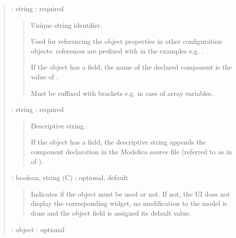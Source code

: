 \documentclass[letterpaper,10pt, openany,english]{sphinxmanual}
\begin{document}
\label{\detokenize{requirements:elementary-object}}
\begin{quote}

 : string : required
\begin{quote}

\begin{DUlineblock}{0em}
\item[] Unique string identifier.
\item[] Used for referencing the object properties in other configuration objects: references are prefixed with \sphinxcode{\sphinxupquote{\#}} in the examples e.g. .
\item[] If the object has a  field, the name of the declared component is the value of .
\item[] Must be suffixed with brackets e.g. \sphinxcode{\sphinxupquote{{[}2{]}}} in case of array variables.
\end{DUlineblock}
\end{quote}

 : string : required
\begin{quote}

\begin{DUlineblock}{0em}
\item[] Descriptive string.
\item[] If the object has a  field, the descriptive string appends the component declaration in the Modelica source file (referred to as  in  of ).
\end{DUlineblock}
\end{quote}

 : boolean, string (C) : optional, default 
\begin{quote}

Indicates if the object must be used or not. If not, the UI does not display the corresponding widget, no modification to the model is done and the object field  is assigned its default value.
\end{quote}

 : object : optional
\begin{quote}


\end{quote}
\end{quote}
\end{document}
